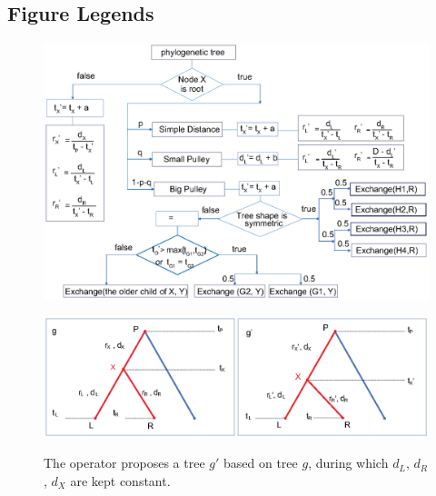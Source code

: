 \documentclass{bmcart}
\begin{document}
\begin{backmatter}



\section*{Figure Legends}
\begin{figure}[h!]
\includegraphics[width=12cm]{Fig01-flowchart.eps}\\
\caption{}
\label{flowchart}
\end{figure}

\begin{figure}[h!]
\includegraphics[width=12cm]{Fig02-internalnode.eps}\\
\caption{
             The operator proposes a tree ${g}'$ based on tree $g$, during which $d_L$, $d_R$, $d_X$ are kept constant.}
\label{internalnodes}
\end{figure}


\end{backmatter}
\end{document}
